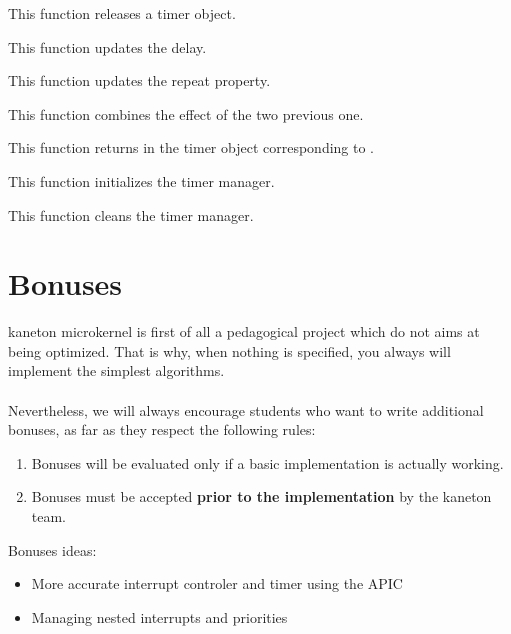 	 {
	   This function releases a timer object.
	 }

	 {
	   This function updates the delay.
	 }

	 {
	   This function updates the repeat property.
	 }

	 {
	   This function combines the effect of the two previous one.
	 }

	 {
	   This function returns in  the timer object
	   corresponding to .
	 }

	 {
	   This function initializes the timer manager.
	 }

	 {
	   This function cleans the timer manager.
	 }

%
%

\newpage

\section{Bonuses}

kaneton microkernel is first of all a pedagogical project which do not
aims at being optimized. That is why, when nothing is specified, you
always will implement the simplest algorithms.\\
\\
Nevertheless, we will always encourage students who want to write
additional bonuses, as far as they respect the following rules:

\begin{enumerate}
\item Bonuses will be evaluated only if a basic implementation is
  actually working.
\item Bonuses must be accepted \textbf{prior to the implementation}
  by the kaneton team.
\end{enumerate}

Bonuses ideas:
\begin{itemize}
\item More accurate interrupt controler and timer using the APIC
\item Managing nested interrupts and priorities
\end{itemize}

